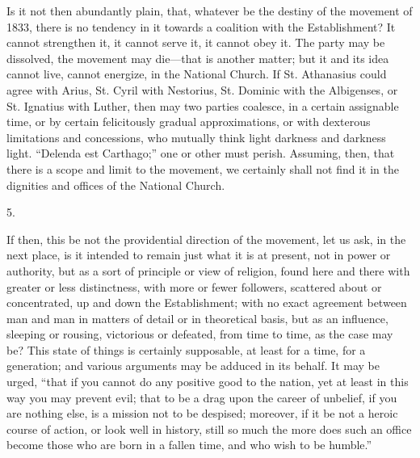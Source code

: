 Is it not then abundantly plain, that, whatever be the destiny of
the movement of 1833, there is no tendency in it towards a coalition
with the Establishment? It cannot strengthen it, it cannot serve it,
it cannot obey it. The party may be dissolved, the movement may die—that
is another matter; but it and its idea cannot live, cannot energize,
in the National Church. If St. Athanasius could agree with Arius, St.
Cyril with Nestorius, St. Dominic with the Albigenses, or St. Ignatius
with Luther, then may two parties coalesce, in a certain assignable
time, or by certain felicitously gradual approximations, or with
dexterous limitations and concessions, who mutually think light
darkness and darkness light. ``Delenda est Carthago;'' one or
other must perish. Assuming, then, that there is a scope and limit to
the movement, we certainly shall not find it in the dignities and
offices of the National Church.

5.

If then, this be not the providential direction of the movement,
let us ask, in the next place, is it intended to remain just what it
is at present, not in power or authority, but as a sort of principle
or view of religion, found here and there with greater or less
distinctness, with more or fewer followers, scattered about or
concentrated, up and down the Establishment; with no exact agreement
between man and man in matters of detail or in theoretical basis, but
as an influence, sleeping or rousing, victorious or defeated, from
time to time, as the case may be? This state of things is certainly
supposable, at least for a time, for a generation; and various
arguments may be adduced in its behalf. It may be urged, ``that if
you cannot do any positive good to the nation, yet at least in this
way you may prevent evil; that to be a drag upon the career of
unbelief, if you are nothing else, is a mission not to be despised;
moreover, if it be not a heroic course of action, or look well in
history, still so much the more does such an office become those who
are born in a fallen time, and who wish to be humble.''


